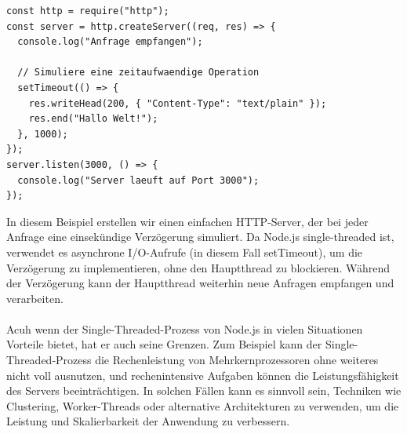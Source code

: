 \documentclass[../vs-script-first-v01.tex]{subfiles}
\begin{document}
\begin{lstlisting}[caption={Node.js Single Threaded},captionpos=b,label={lst:single}]
const http = require("http");
const server = http.createServer((req, res) => {
  console.log("Anfrage empfangen");

  // Simuliere eine zeitaufwaendige Operation
  setTimeout(() => {
    res.writeHead(200, { "Content-Type": "text/plain" });
    res.end("Hallo Welt!");
  }, 1000);
});
server.listen(3000, () => {
  console.log("Server laeuft auf Port 3000");
});
\end{lstlisting}
In diesem Beispiel erstellen wir einen einfachen HTTP-Server, der bei jeder Anfrage eine einsekündige Verzögerung simuliert. Da Node.js single-threaded ist, verwendet es asynchrone I/O-Aufrufe (in diesem Fall setTimeout), um die Verzögerung zu implementieren, ohne den Hauptthread zu blockieren. Während der Verzögerung kann der Hauptthread weiterhin neue Anfragen empfangen und verarbeiten.
\\\\
Acuh wenn der Single-Threaded-Prozess von Node.js in vielen Situationen Vorteile bietet, hat er auch seine Grenzen. Zum Beispiel kann der Single-Threaded-Prozess die Rechenleistung von Mehrkernprozessoren ohne weiteres nicht voll ausnutzen, und rechenintensive Aufgaben können die Leistungsfähigkeit des Servers beeinträchtigen. In solchen Fällen kann es sinnvoll sein, Techniken wie Clustering, Worker-Threads oder alternative Architekturen zu verwenden, um die Leistung und Skalierbarkeit der Anwendung zu verbessern.
\end{document}
